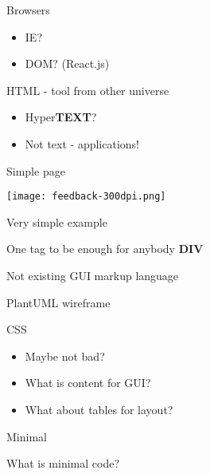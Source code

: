 \documentclass{beamer}
\renewcommand{\alert}[1]{\textbf{#1}}
\begin{document}
\begin{frame}{Browsers}
 \begin{itemize}
  \item IE?
  \pause
  \item DOM? (React.js)
 \end{itemize}
\end{frame}


\begin{frame}{HTML - tool from other universe}
 \begin{itemize}
  \item Hyper\textbf{TEXT}?
  \pause
  \item Not text - applications!
 \end{itemize}
\end{frame}

\begin{frame}{Simple page}
 \begin{center}
  \texttt{[image: feedback-300dpi.png]}
 \end{center}
\end{frame}

\begin{frame}[shrink]{Very simple example}
 
\end{frame}

\begin{frame}{One tag to be enough for anybody}
 \alert{DIV}
\end{frame}

\begin{frame}[shrink]{Not existing GUI markup language}
 
\end{frame}

\begin{frame}[shrink]{PlantUML wireframe}
 
\end{frame}

\begin{frame}{CSS}
 \begin{itemize}
  \item Maybe not bad?
  \pause
  \item What is content for GUI?
  \pause
  \item What about tables for layout?
 \end{itemize}
\end{frame}

\begin{frame}{Minimal}
 \begin{center}
  What is minimal code?
 \end{center}
\end{frame}
\end{document}
